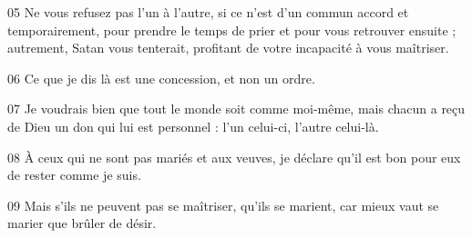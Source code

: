 
05 Ne vous refusez pas l’un à l’autre, si ce n’est d’un commun accord et temporairement, pour prendre le temps de prier et pour vous retrouver ensuite ; autrement, Satan vous tenterait, profitant de votre incapacité à vous maîtriser.

06 Ce que je dis là est une concession, et non un ordre.

07 Je voudrais bien que tout le monde soit comme moi-même, mais chacun a reçu de Dieu un don qui lui est personnel : l’un celui-ci, l’autre celui-là.

08 À ceux qui ne sont pas mariés et aux veuves, je déclare qu’il est bon pour eux de rester comme je suis.

09 Mais s’ils ne peuvent pas se maîtriser, qu’ils se marient, car mieux vaut se marier que brûler de désir.
